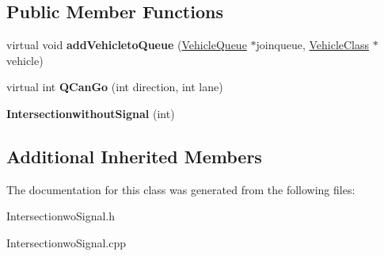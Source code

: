 \subsection*{Public Member Functions}
\begin{DoxyCompactItemize}
\item 
\hypertarget{class_intersectionwithout_signal_ab538d75fb2afe614867754e0debbd2e2}{virtual void {\bfseries add\-Vehicleto\-Queue} (\hyperlink{class_vehicle_queue}{Vehicle\-Queue} $\ast$joinqueue, \hyperlink{class_vehicle_class}{Vehicle\-Class} $\ast$vehicle)}\label{class_intersectionwithout_signal_ab538d75fb2afe614867754e0debbd2e2}

\item 
\hypertarget{class_intersectionwithout_signal_ac003b0651a33eb53986c4b0389f2c788}{virtual int {\bfseries Q\-Can\-Go} (int direction, int lane)}\label{class_intersectionwithout_signal_ac003b0651a33eb53986c4b0389f2c788}

\item 
\hypertarget{class_intersectionwithout_signal_a7afe1b9d80f5424b5cb36448245b3453}{{\bfseries Intersectionwithout\-Signal} (int)}\label{class_intersectionwithout_signal_a7afe1b9d80f5424b5cb36448245b3453}

\end{DoxyCompactItemize}
\subsection*{Additional Inherited Members}


The documentation for this class was generated from the following files\-:\begin{DoxyCompactItemize}
\item 
Intersectionwo\-Signal.\-h\item 
Intersectionwo\-Signal.\-cpp\end{DoxyCompactItemize}
